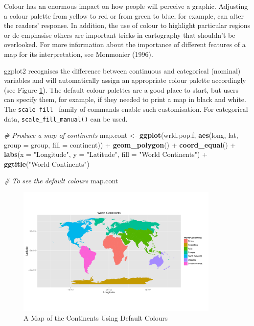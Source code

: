 \documentclass[]{article}
\newenvironment{Shaded}{}{}
\newcommand{\KeywordTok}[1]{\textcolor[rgb]{0.00,0.44,0.13}{\textbf{{#1}}}}
\newcommand{\DataTypeTok}[1]{\textcolor[rgb]{0.56,0.13,0.00}{{#1}}}
\newcommand{\StringTok}[1]{\textcolor[rgb]{0.25,0.44,0.63}{{#1}}}
\newcommand{\CommentTok}[1]{\textcolor[rgb]{0.38,0.63,0.69}{\textit{{#1}}}}
\newcommand{\NormalTok}[1]{{#1}}
\let\Oldincludegraphics\includegraphics
\renewcommand{\includegraphics}[1]{\Oldincludegraphics[width=10cm]{#1}}
\begin{document}
Colour has an enormous impact on how people will perceive a graphic.
Adjusting a colour palette from yellow to red or from green to blue, for
example, can alter the readers' response. In addition, the use of colour
to highlight particular regions or de-emphasise others are important
tricks in cartography that shouldn't be overlooked. For more
information about the importance of different features of a map for its
interpretation, see Monmonier (1996).

ggplot2 recognises the difference between continuous and categorical
(nominal) variables and will automatically assign an appropriate colour
palette accordingly (see Figure \ref{fworldconts}). The default colour palettes are a
good place to start, but users can specify them, for example, if they needed to print a  map in black and white. The
\texttt{scale\_fill\_} family of commands enable such customisation. For
categorical data, \texttt{scale\_fill\_manual()} can be used.

\begin{Shaded}
\begin{Highlighting}[]
\CommentTok{# Produce a map of continents}
\NormalTok{map.cont <- }\KeywordTok{ggplot}\NormalTok{(wrld.pop.f, }\KeywordTok{aes}\NormalTok{(long, lat, }\DataTypeTok{group =} \NormalTok{group, }\DataTypeTok{fill =} \NormalTok{continent)) + }
    \KeywordTok{geom_polygon}\NormalTok{() + }\KeywordTok{coord_equal}\NormalTok{() + }\KeywordTok{labs}\NormalTok{(}\DataTypeTok{x =} \StringTok{"Longitude"}\NormalTok{, }\DataTypeTok{y =} \StringTok{"Latitude"}\NormalTok{, }\DataTypeTok{fill =} \StringTok{"World Continents"}\NormalTok{) + }
    \KeywordTok{ggtitle}\NormalTok{(}\StringTok{"World Continents"}\NormalTok{)}

\CommentTok{# To see the default colours}
\NormalTok{map.cont}
\end{Highlighting}
\end{Shaded}
\begin{figure}[htbp]
\centering
\includegraphics{figs/A_Map_of_the_Continents_Using_Default_Colours}
\caption{A Map of the Continents Using Default Colours} \label{fworldconts}
\end{figure}
\end{document}
